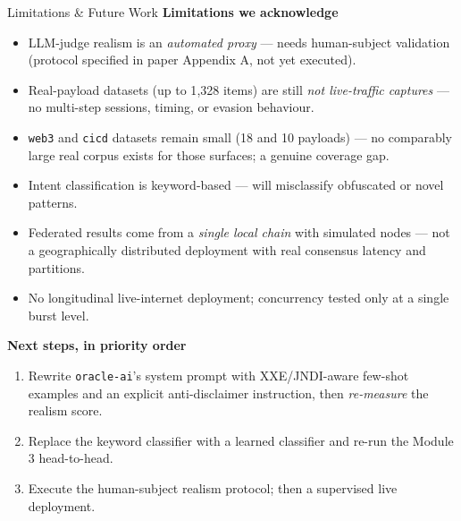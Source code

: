 \documentclass[aspectratio=169,11pt]{beamer}
\begin{document}
\begin{frame}{Limitations \& Future Work}
  \scriptsize
  \textbf{\color{navy}Limitations we acknowledge}
  \begin{itemize}\setlength\itemsep{1.5pt}
    \item LLM-judge realism is an \emph{automated proxy} --- needs human-subject validation
      (protocol specified in paper Appendix A, not yet executed).
    \item Real-payload datasets (up to 1{,}328 items) are still \emph{not live-traffic captures} ---
      no multi-step sessions, timing, or evasion behaviour.
    \item \texttt{web3} and \texttt{cicd} datasets remain small (18 and 10 payloads) --- no comparably
      large real corpus exists for those surfaces; a genuine coverage gap.
    \item Intent classification is keyword-based --- will misclassify obfuscated or novel patterns.
    \item Federated results come from a \emph{single local chain} with simulated nodes --- not a
      geographically distributed deployment with real consensus latency and partitions.
    \item No longitudinal live-internet deployment; concurrency tested only at a single burst level.
  \end{itemize}
  \vspace{2pt}
  \textbf{\color{navy}Next steps, in priority order}
  \begin{enumerate}\setlength\itemsep{1.5pt}
    \item Rewrite \texttt{oracle-ai}'s system prompt with XXE/JNDI-aware few-shot examples and an
      explicit anti-disclaimer instruction, then \emph{re-measure} the realism score.
    \item Replace the keyword classifier with a learned classifier and re-run the Module 3 head-to-head.
    \item Execute the human-subject realism protocol; then a supervised live deployment.
  \end{enumerate}
\end{frame}
\end{document}
